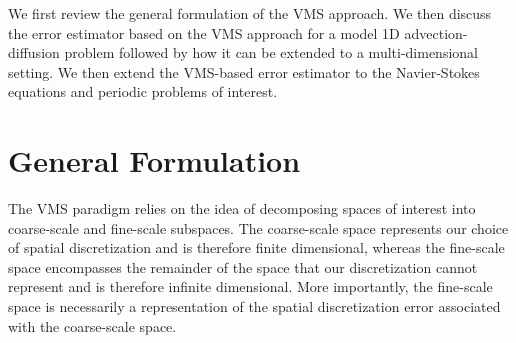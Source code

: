 We first review the general formulation of the VMS approach.
We then discuss the error estimator based on the VMS approach for a model 1D advection-diffusion problem followed by how it can be extended to a multi-dimensional setting.
We then extend the VMS-based error estimator to the Navier-Stokes equations and periodic problems of interest.

\section{General Formulation}
\label{sec:VMS_form}


The VMS paradigm relies on the idea of decomposing spaces of interest into coarse-scale and fine-scale subspaces.
The coarse-scale space represents our choice of spatial discretization and is therefore finite dimensional, whereas the fine-scale space encompasses the remainder of the space that our discretization cannot represent and is therefore infinite dimensional.
More importantly, the fine-scale space is necessarily a representation of the spatial discretization error associated with the coarse-scale space.

